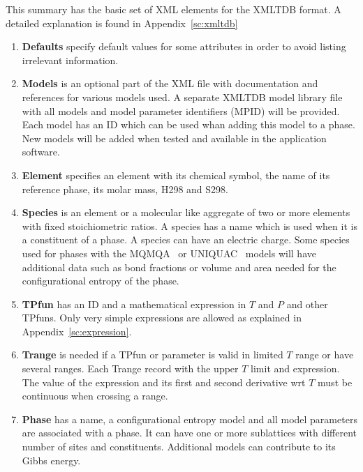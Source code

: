 \documentclass[12pt]{article}
\begin{document}
This summary has the basic set of XML elements for the XMLTDB format.
A detailed explanation is found in Appendix~\ref{sc:xmltdb}

\begin{enumerate}
\item {\bf Defaults} specify default values for some attributes in
  order to avoid listing irrelevant information.
  
\item {\bf Models} is an optional part of the XML file with
  documentation and references for various models used.  A separate
  XMLTDB model library file with all models and model parameter
  identifiers (MPID) will be provided.  Each model has an ID which can
  be used whan adding this model to a phase.  New models will be added
  when tested and available in the application software.
  
\item {\bf Element} specifies an element with its chemical symbol, the
  name of its reference phase, its molar mass, H298 and S298.
  
\item {\bf Species} is an element or a molecular like aggregate of two
  or more elements with fixed stoichiometric ratios.  A species has a
  name which is used when it is a constituent of a phase.  A species
  can have an electric charge.  Some species used for phases with the
  MQMQA~\cite{01Pel2} or UNIQUAC~\cite{20Li} models will have
  additional data such as bond fractions or volume and area needed for
  the configurational entropy of the phase.
    
\item {\bf TPfun} has an ID and a mathematical expression in $T$ and
  $P$ and other TPfuns.  Only very simple expressions are allowed as
  explained in Appendix~\ref{sc:expression}.
  
\item {\bf Trange} is needed if a TPfun or parameter is valid in
  limited $T$ range or have several ranges.  Each Trange record with
  the upper $T$ limit and expression.  The value of the expression and
  its first and second derivative wrt $T$ must be continuous when
  crossing a range.
  
\item {\bf Phase} has a name, a configurational entropy model and all
  model parameters are associated with a phase.  It can have one or
  more sublattices with different number of sites and constituents.
  Additional models can contribute to its Gibbs energy.
  

\end{enumerate}
\end{document}
